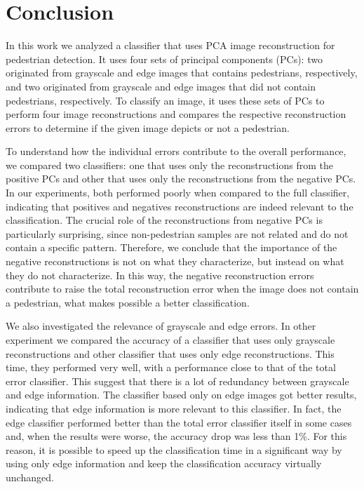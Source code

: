\documentclass[10pt, conference, compsocconf]{IEEEtran}
\begin{document}
\section{Conclusion}

In this work we analyzed a classifier that uses PCA image reconstruction for pedestrian detection. It uses four sets of principal components (PCs): two originated from grayscale and edge images that contains pedestrians, respectively, and two originated from grayscale and edge images that did not contain pedestrians, respectively. To classify an image, it uses these sets of PCs to perform four image reconstructions and compares the respective reconstruction errors to determine if the given image depicts or not a pedestrian.

To understand how the individual errors contribute to the overall performance, we compared two classifiers: one that uses only the reconstructions from the positive PCs and other that uses only the reconstructions from the negative PCs. In our experiments, both performed poorly when compared to the full classifier, indicating that positives and negatives reconstructions are indeed relevant to the classification. The crucial role of the reconstructions from negative PCs is particularly surprising, since non-pedestrian samples are not related and do not contain a specific pattern. Therefore, we conclude that the importance of the negative reconstructions is not on what they characterize, but instead on what they do not characterize. In this way, the negative reconstruction errors contribute to raise the total reconstruction error when the image does not contain a pedestrian, what makes possible a better classification.

We also investigated the relevance of grayscale and edge errors. In other experiment we compared the accuracy of a classifier that uses only grayscale reconstructions and other classifier that uses only edge reconstructions. This time, they performed very well, with a performance close to that of the total error classifier. This suggest that there is a lot of redundancy between grayscale and edge information. The classifier based only on edge images got better results, indicating that edge information is more relevant to this classifier. In fact, the edge classifier performed better than the total error classifier itself in some cases and, when the results were worse, the accuracy drop was less than 1\%. For this reason, it is possible to speed up the classification time in a significant way by using only edge information and keep the classification accuracy virtually unchanged.
\end{document}
